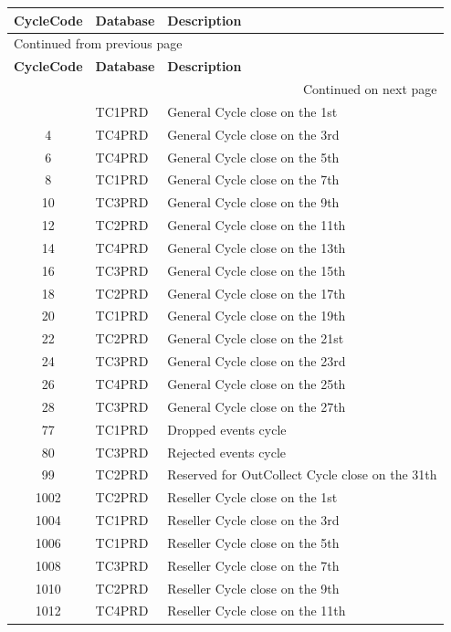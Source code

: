 \documentclass[12pt,twoside]{article}
\begin{document}
\begin{longtable}{c|l|l}
\hline
\textbf{CycleCode} & \textbf{Database} & \textbf{Description}\\
\hline
\endfirsthead
\multicolumn{3}{l}{Continued from previous page} \\
\hline

\textbf{CycleCode} & \textbf{Database} & \textbf{Description} \\

\hline
\endhead
\hline\multicolumn{3}{r}{Continued on next page} \\
\endfoot
\endlastfoot
\hline
2 & TC1PRD & General Cycle close on the 1st\\
4 & TC4PRD & General Cycle close on the 3rd\\
6 & TC4PRD & General Cycle close on the 5th\\
8 & TC1PRD & General Cycle close on the 7th\\
10 & TC3PRD & General Cycle close on the 9th\\
12 & TC2PRD & General Cycle close on the 11th\\
14 & TC4PRD & General Cycle close on the 13th\\
16 & TC3PRD & General Cycle close on the 15th\\
18 & TC2PRD & General Cycle close on the 17th\\
20 & TC1PRD & General Cycle close on the 19th\\
22 & TC2PRD & General Cycle close on the 21st\\
24 & TC3PRD & General Cycle close on the 23rd\\
26 & TC4PRD & General Cycle close on the 25th\\
28 & TC3PRD & General Cycle close on the 27th\\
77 & TC1PRD & Dropped events cycle\\
80 & TC3PRD & Rejected events cycle\\
99 & TC2PRD & Reserved for OutCollect Cycle close on the 31th\\
1002 & TC2PRD & Reseller Cycle close on the 1st\\
1004 & TC1PRD & Reseller Cycle close on the 3rd\\
1006 & TC1PRD & Reseller Cycle close on the 5th\\
1008 & TC3PRD & Reseller Cycle close on the 7th\\
1010 & TC2PRD & Reseller Cycle close on the 9th\\
1012 & TC4PRD & Reseller Cycle close on the 11th\\

\end{longtable}
\end{document}
